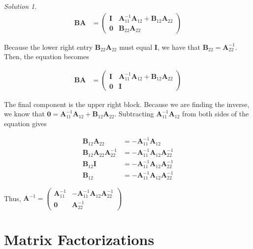 \documentclass[
]{book}
\theoremstyle{definition}
\theoremstyle{definition}
\theoremstyle{definition}
\theoremstyle{definition}
\theoremstyle{remark}
\newtheorem*{solution}{Solution}
\begin{document}
\begin{solution}
\[
\begin{aligned}
\mathbf{B}\mathbf{A} & = \begin{pmatrix} \mathbf{I} & \mathbf{A}_{11}^{-1} \mathbf{A}_{12} + \mathbf{B}_{12} \mathbf{A}_{22} \\ \mathbf{0} & \mathbf{B}_{22} \mathbf{A}_{22}\end{pmatrix}
\end{aligned}
\]

Because the lower right entry \(\mathbf{B}_{22} \mathbf{A}_{22}\) must equal \(\mathbf{I}\), we have that \(\mathbf{B}_{22} = \mathbf{A}_{22}^{-1}\). Then, the equation becomes

\[
\begin{aligned}
\mathbf{B}\mathbf{A} & = \begin{pmatrix} \mathbf{I} & \mathbf{A}_{11}^{-1} \mathbf{A}_{12} + \mathbf{B}_{12} \mathbf{A}_{22} \\ \mathbf{0} & \mathbf{I} \end{pmatrix}
\end{aligned}
\]

The final component is the upper right block. Because we are finding the inverse, we know that \(\mathbf{0} = \mathbf{A}_{11}^{-1} \mathbf{A}_{12} + \mathbf{B}_{12} \mathbf{A}_{22}\). Subtracting \(\mathbf{A}_{11}^{-1} \mathbf{A}_{12}\) from both sides of the equation gives

\[
\begin{aligned}
\mathbf{B}_{12} \mathbf{A}_{22} & = - \mathbf{A}_{11}^{-1} \mathbf{A}_{12} \\
\mathbf{B}_{12} \mathbf{A}_{22} \mathbf{A}_{22}^{-1} & = - \mathbf{A}_{11}^{-1} \mathbf{A}_{12} \mathbf{A}_{22}^{-1}\\
\mathbf{B}_{12} \mathbf{I} & = - \mathbf{A}_{11}^{-1} \mathbf{A}_{12} \mathbf{A}_{22}^{-1}\\
\mathbf{B}_{12} & = - \mathbf{A}_{11}^{-1} \mathbf{A}_{12} \mathbf{A}_{22}^{-1}
\end{aligned}
\]

Thus, \(\mathbf{A}^{-1} = \begin{pmatrix} \mathbf{A}_{11}^{-1} & - \mathbf{A}_{11}^{-1} \mathbf{A}_{12} \mathbf{A}_{22}^{-1} \\ \mathbf{0} & \mathbf{A}_{22}^{-1} \end{pmatrix}\)
\end{solution}

\hypertarget{matrix-factorizations}{%
\chapter{Matrix Factorizations}\label{matrix-factorizations}}
\end{document}
